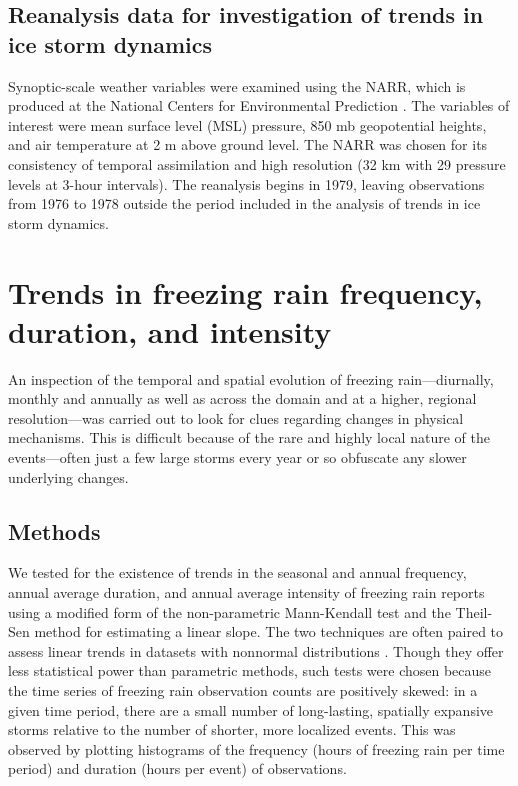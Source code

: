 \documentclass[twocol]{ametsoc}
\begin{document}
\subsection{Reanalysis data for investigation of trends in ice storm dynamics}
Synoptic-scale weather variables were examined using the NARR, which is produced at the National Centers for Environmental Prediction \citep{mesinger2006north}. The variables of interest were mean surface level (MSL) pressure, 850 mb geopotential heights, and air temperature at 2 m above ground level. The NARR was chosen for its consistency of temporal assimilation and high resolution (32 km with 29 pressure levels at 3-hour intervals). The reanalysis begins in 1979, leaving observations from 1976 to 1978 outside the period included in the analysis of trends in ice storm dynamics.


\section{Trends in freezing rain frequency, duration, and intensity}
An inspection of the temporal and spatial evolution of freezing rain---diurnally, monthly and annually as well as across the domain and at a higher, regional resolution---was carried out to look for clues regarding changes in physical mechanisms. This is difficult because of the rare and highly local nature of the events---often just a few large storms every year or so obfuscate any slower underlying changes.
\subsection{Methods}
We tested for the existence of trends in the seasonal and annual frequency, annual average duration, and annual average intensity of freezing rain reports using a modified form of the non-parametric Mann-Kendall test and the Theil-Sen method for estimating a linear slope. The two techniques are often paired to assess linear trends in datasets with nonnormal distributions \citep{chandler2011statistical}. Though they offer less statistical power than parametric methods, such tests were chosen because the time series of freezing rain observation counts are positively skewed: in a given time period, there are a small number of long-lasting, spatially expansive storms relative to the number of shorter, more localized events. This was observed by plotting histograms of the frequency (hours of freezing rain per time period) and duration (hours per event) of observations.
\end{document}
